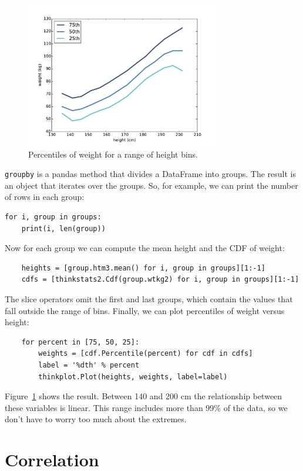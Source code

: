 \documentclass[12pt]{book}
\begin{document}
\begin{figure}
\centerline{\includegraphics[height=2.5in]{figs/scatter3.pdf}}
\caption{Percentiles of weight for a range of height bins.}
\label{scatter3}
\end{figure}

{\tt groupby} is a pandas method that divides a DataFrame into groups.
The result is an object that iterates over the groups.  So, for example,
we can print the number of rows in each group:

\begin{verbatim}
for i, group in groups:
    print(i, len(group))
\end{verbatim}

Now for each group we can compute the mean height and the CDF
of weight:

\begin{verbatim}
    heights = [group.htm3.mean() for i, group in groups][1:-1]
    cdfs = [thinkstats2.Cdf(group.wtkg2) for i, group in groups][1:-1]
\end{verbatim}

The slice operators omit the first and last groups, which contain
the values that fall outside the range of bins.  Finally, we can
plot percentiles of weight versus height:

\begin{verbatim}
    for percent in [75, 50, 25]:
        weights = [cdf.Percentile(percent) for cdf in cdfs]
        label = '%dth' % percent
        thinkplot.Plot(heights, weights, label=label)
\end{verbatim}

Figure~\ref{scatter3} shows the result.  Between 140 and 200 cm
the relationship between these variables is linear.  This range
includes more than 99\% of the data, so we don't have to worry
too much about the extremes.


\section{Correlation}
\end{document}
